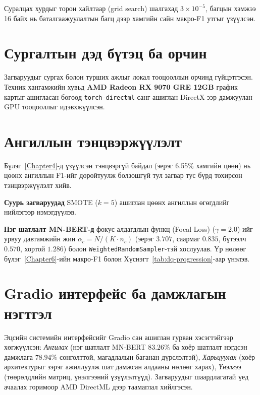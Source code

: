 Суралцах хурдыг торон хайлтаар (grid search) шалгахад $3\times10^{-5}$,
багцын хэмжээ 16 байх нь баталгаажуулалтын багц дээр хамгийн сайн макро-F1
утгыг үзүүлсэн.

\section{Сургалтын дэд бүтэц ба орчин}

Загваруудыг сургах болон турших ажлыг локал тооцооллын орчинд гүйцэтгэсэн.
Техник хангамжийн хувьд \textbf{AMD Radeon RX 9070 GRE 12GB} график картыг
ашигласан бөгөөд \texttt{torch-directml} санг ашиглан DirectX-ээр дамжуулан
GPU тооцооллыг идэвхжүүлсэн.

\section{Ангиллын тэнцвэржүүлэлт}

Бүлэг~\ref{Chapter4}-д үзүүлсэн тэнцвэргүй байдал (эерэг 6.55\% хамгийн цөөн)
нь цөөнх ангиллын F1-ийг доройтуулж болзошгүй тул загвар тус бүрд тохирсон
тэнцвэржүүлэлт хийв.

\textbf{Суурь загваруудад} SMOTE ($k\!=\!5$) ашиглан цөөнх ангиллын өгөгдлийг
нийлэгээр нэмэгдүүлэв.

\textbf{Нэг шатлалт MN-BERT-д} фокус алдагдлын функц (Focal Loss) ($\gamma{=}2.0$)-ийг урвуу
давтамжийн жин $\alpha_c = N/(K\cdot n_c)$ (эерэг $3.707$, саармаг $0.835$,
бүтээлч $0.570$, хортой $1.286$) болон \texttt{WeightedRandomSampler}-тэй
хослуулав. Үр нөлөөг бүлэг~\ref{Chapter6}-ийн макро-F1 болон
Хүснэгт~\ref{tab:dq-progression}-аар үнэлэв.

\section{Gradio интерфейс ба дамжлагын нэгтгэл}


Эцсийн системийн интерфейсийг Gradio сан ашиглан гурван хэсэгтэйгээр
хөгжүүлсэн: \textit{Ангилах} (нэг шатлалт MN-BERT $83.26\%$ ба хоёр шатлалт
нэгдсэн дамжлага $78.94\%$ сонголттой, магадлалын баганан дүрслэлтэй),
\textit{Харьцуулах} (хоёр
архитектурыг зэрэг ажиллуулж шат дамжсан алдааны нөлөөг харах), \textit{Үнэлгээ}
(төөрөлдлийн матриц, үнэлгээний үзүүлэлтүүд). Загваруудыг шаардлагатай үед ачаалах
горимоор AMD DirectML дээр таамаглал хийлгэсэн.

